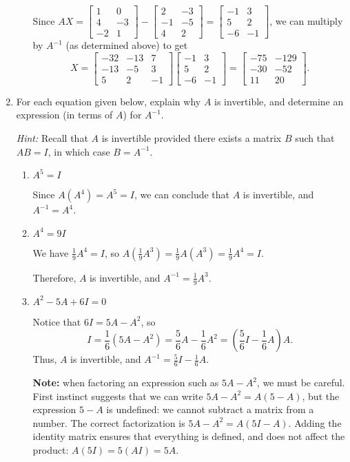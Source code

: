\documentclass[12pt]{article}
\newcommand{\bbm}{\begin{bmatrix}}
\newcommand{\ebm}{\end{bmatrix}}
\begin{document}
\begin{enumerate}
\begin{enumerate}
Since $AX = \bbm 1&0\\4&-3\\-2&1\ebm - \bbm 2&-3\\-1&-5\\4&2\ebm = \bbm -1&3\\5&2\\-6&-1\ebm$, we can multiply by $A^{-1}$ (as determined above) to get
\[
X = \bbm -32 &-13&7\\-13&-5&3\\5&2&-1\ebm \bbm -1&3\\5&2\\-6&-1\ebm = \bbm -75&-129\\-30&-52\\11&20\ebm.
\]

\end{enumerate}
\newpage

\item For each equation given below, explain why $A$ is invertible, and determine an expression (in terms of $A$) for $A^{-1}$.

\textit{Hint:} Recall that $A$ is invertible provided there exists a matrix $B$ such that $AB=I$, in which case $B=A^{-1}$.

\begin{enumerate}
\item $A^5=I$

\bigskip

Since $A(A^4) = A^5 = I$, we can conclude that $A$ is invertible, and $A^{-1}=A^4$.

\bigskip

\item $A^4=9I$

\bigskip

We have $\frac19 A^4 = I$, so $A\left(\frac19 A^3\right) = \frac19 A(A^3)=\frac19 A^4=I$.

Therefore, $A$ is invertible, and $A^{-1} = \frac19 A^3$.

\bigskip



\item $A^2-5A+6I=0$

\bigskip

Notice that $6I=5A-A^2$, so 
\[
I = \frac16 (5A-A^2) = \frac56 A-\frac16 A^2 = (\frac56 I -\frac16 A)A.
\]
Thus, $A$ is invertible, and $A^{-1} = \frac56 I-\frac16 A$.

\textbf{Note:} when factoring an expression such as $5A-A^2$, we must be careful. First instinct suggests that we can write $5A-A^2=A(5-A)$, but the expression $5-A$ is undefined: we cannot subtract a matrix from a number. The correct factorization is $5A-A^2 = A(5I-A)$. Adding the identity matrix ensures that everything is defined, and does not affect the product: $A(5I) = 5(AI)=5A$.
\end{enumerate}


\end{enumerate}
\end{document}
